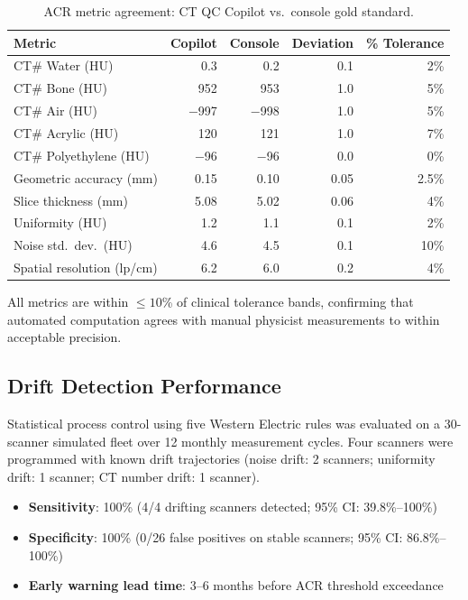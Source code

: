 \documentclass[11pt]{article}
\theoremstyle{definition}
\begin{document}
\begin{table}[htbp]
\centering
\caption{ACR metric agreement: CT QC Copilot vs.\ console gold standard.}
\label{tab:acr_metrics}
\begin{tabular}{l r r r r}
\toprule
\textbf{Metric} & \textbf{Copilot} & \textbf{Console} &
  \textbf{Deviation} & \textbf{\% Tolerance} \\
\midrule
CT\# Water (HU)          & 0.3     & 0.2     & 0.1   & 2\% \\
CT\# Bone (HU)           & 952     & 953     & 1.0   & 5\% \\
CT\# Air (HU)            & $-$997  & $-$998  & 1.0   & 5\% \\
CT\# Acrylic (HU)        & 120     & 121     & 1.0   & 7\% \\
CT\# Polyethylene (HU)   & $-$96   & $-$96   & 0.0   & 0\% \\
Geometric accuracy (mm)  & 0.15    & 0.10    & 0.05  & 2.5\% \\
Slice thickness (mm)     & 5.08    & 5.02    & 0.06  & 4\% \\
Uniformity (HU)          & 1.2     & 1.1     & 0.1   & 2\% \\
Noise std.\ dev.\ (HU)  & 4.6     & 4.5     & 0.1   & 10\% \\
Spatial resolution (lp/cm) & 6.2   & 6.0     & 0.2   & 4\% \\
\bottomrule
\end{tabular}
\end{table}

\noindent All metrics are within $\leq 10$\% of clinical tolerance bands,
confirming that automated computation agrees with manual physicist
measurements to within acceptable precision.

\subsection{Drift Detection Performance}

Statistical process control using five Western Electric rules was
evaluated on a 30-scanner simulated fleet over 12 monthly measurement
cycles.  Four scanners were programmed with known drift trajectories
(noise drift: 2 scanners; uniformity drift: 1 scanner; CT number drift:
1 scanner).

\begin{itemize}
  \item \textbf{Sensitivity}: 100\% (4/4 drifting scanners detected;
    95\% CI: 39.8\%--100\%)
  \item \textbf{Specificity}: 100\% (0/26 false positives on stable
    scanners; 95\% CI: 86.8\%--100\%)
  \item \textbf{Early warning lead time}: 3--6 months before ACR
    threshold exceedance
\end{itemize}
\end{document}
